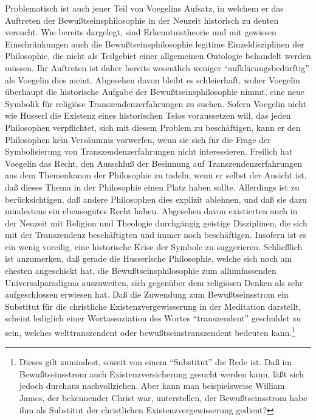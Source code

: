 Problematisch ist auch jener Teil von Voegelins Aufsatz, in welchem er das
Auftreten der Bewußtseinsphilosophie in der Neuzeit historisch zu deuten
versucht. Wie bereits dargelegt, sind Erkenntnistheorie und mit gewissen
Einschränkungen auch die Bewußtseinsphilosophie legitime Einzeldisziplinen der
Philosophie, die nicht als Teilgebiet einer allgemeinen Ontologie behandelt
werden müssen. Ihr Auftreten ist daher bereits wesentlich weniger
"`aufklärungsbedürftig"' als Voegelin dies meint. Abgesehen davon bleibt es
schleierhaft, woher Voegelin überhaupt die historische Aufgabe der
Bewußtseinsphilosophie nimmt, eine neue Symbolik für religiöse
Transzendenzerfahrungen zu suchen. Sofern Voegelin nicht wie Husserl die
Existenz eines historischen Telos voraussetzen will, das jeden Philosophen
verpflichtet, sich mit diesem Problem zu beschäftigen, kann er den Philosophen
kein Versäumnis vorwerfen, wenn sie sich für die Frage der Symbolisierung
von Transzendenzerfahrungen nicht interessieren. Freilich hat Voegelin das
Recht, den Ausschluß der Besinnung auf Transzendenzerfahrungen aus dem
Themenkanon der Philosophie zu tadeln, wenn er selbst der Ansicht ist, daß
dieses Thema in der Philosophie einen Platz haben sollte. Allerdings ist zu
berücksichtigen, daß andere Philosophen dies explizit ablehnen, und daß sie
dazu mindestens ein ebensogutes Recht haben. Abgesehen davon existierten auch
in der Neuzeit mit Religion und Theologie durchgängig geistige Disziplinen, die
sich mit der Transzendenz beschäftigten und immer noch beschäftigen. Insofern
ist es ein wenig voreilig, eine historische Krise der Symbole zu suggerieren.
Schließlich ist anzumerken, daß gerade die Husserlsche Philosophie, welche
sich noch am ehesten angeschickt hat, die Bewußtseinsphilosophie zum
allumfassenden Universalparadigma auszuweiten, sich gegenüber dem religiösen
Denken als sehr aufgeschlossen erwiesen hat. Daß die Zuwendung zum
Bewußtseinsstrom ein Substitut für die christliche Existenzvergewisserung in
der Meditation darstellt, scheint lediglich einer Wortassoziation des Wortes
"`transzendent"' geschuldet zu sein, welches welttranszendent oder
bewußtseinstranszendent bedeuten kann.\footnote{Dieses gilt zumindest, soweit
  von einem "`Substitut"' die Rede ist. Daß im Bewußtseinsstrom auch
  Existenzversicherung gesucht werden kann, läßt sich jedoch durchaus
  nachvollziehen. Aber kann man beispielsweise William James, der bekennender
  Christ war, unterstellen, der Bewußtseinsstrom habe ihm als Substitut der
  christlichen Existenzvergewisserung gedient?}

